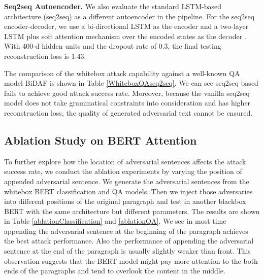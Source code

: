 \textbf{Seq2seq Autoencoder.} We also evaluate the standard LSTM-based architecture (seq2seq) as a different autoencoder in the \advcodec pipeline. For the seq2seq encoder-decoder, we use a bi-directional LSTM as the encoder \citep{Hochreiter1997LongSM} and a two-layer LSTM plus soft attention mechanism over the encoded states as the decoder \citep{Bahdanau2015NeuralMT}. With 400-d hidden units and the dropout rate of 0.3, the final testing reconstruction loss is 1.43.

The comparison of the whitebox attack capability  against a well-known QA model BiDAF is shown in Table \ref{WhiteboxQAseq2seq}. We can see seq2seq based \advcodec fails to achieve good attack success rate. Moreover, because the vanilla seq2seq model does not take grammatical constraints into consideration and has higher reconstruction loss, the quality of generated adversarial text cannot be ensured.

\subsection{Ablation Study on BERT Attention}
\label{sec:ablation}
To further explore how the location of adversarial sentences affects the attack success rate, we conduct the ablation experiments by varying the position of appended adversarial sentence. We generate the adversarial sentences from the whitebox BERT classification and QA models. Then we inject those adversaries into different positions of the original paragraph and test in another blackbox BERT with the same architecture but different parameters. The results are shown in Table \ref{ablationClassification} and \ref{ablationQA}. We see in most time appending the adversarial sentence at the beginning of the paragraph achieves the best attack performance. Also the performance of appending the adversarial sentence at the end of the paragraph is usually slightly weaker than front. This observation suggests that the BERT model might pay more attention to the both ends of the paragraphs and tend to overlook the content in the middle.




